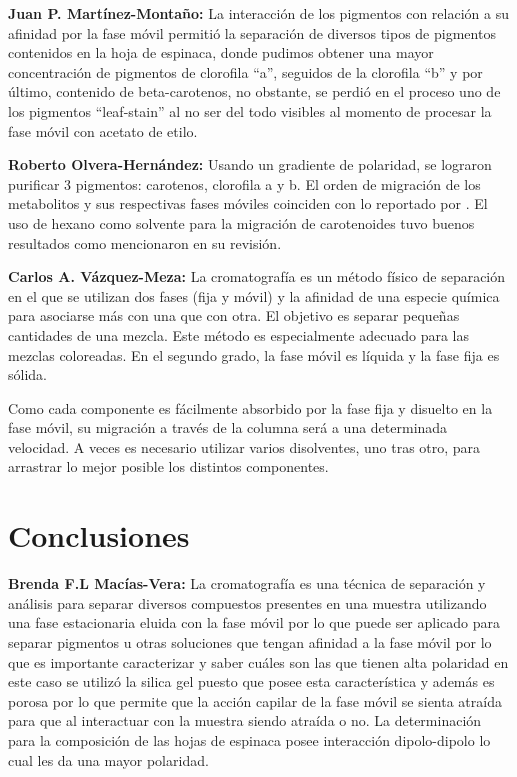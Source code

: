 \documentclass{ITESO-Report}
\begin{document}
{\color{darkgray}\bfseries Juan P. Martínez-Montaño:}\hspace{1em}
La interacción de los pigmentos con relación a su afinidad por la fase móvil permitió la separación de diversos tipos de pigmentos contenidos en la hoja de espinaca, donde pudimos obtener una mayor concentración de pigmentos de clorofila “a”, seguidos de la clorofila “b” y por último, contenido de beta-carotenos, no obstante, se perdió en el proceso uno de los pigmentos “leaf-stain” al no ser del todo visibles al momento de procesar la fase móvil con acetato de etilo.

{\color{darkgray}\bfseries Roberto Olvera-Hernández:}\hspace{1em}
Usando un gradiente de polaridad, se lograron purificar 3 pigmentos: carotenos, clorofila a y b. El orden de migración de los metabolitos y sus respectivas fases móviles coinciden con lo reportado por \textcite{Khalyfa1992}. El uso de hexano como solvente para la migración de carotenoides tuvo buenos resultados como mencionaron \textcite{Mussagy2018} en su revisión.

{\color{darkgray}\bfseries Carlos A. Vázquez-Meza:}\hspace{1em}
La cromatografía es un método físico de separación en el que se utilizan dos fases (fija y móvil) y la afinidad de una especie química para asociarse más con una que con otra. El objetivo es separar pequeñas cantidades de una mezcla. Este método es especialmente adecuado para las mezclas coloreadas. En el segundo grado, la fase móvil es líquida y la fase fija es sólida.

Como cada componente es fácilmente absorbido por la fase fija y disuelto en la fase móvil, su migración a través de la columna será a una determinada velocidad. A veces es necesario utilizar varios disolventes, uno tras otro, para arrastrar lo mejor posible los distintos componentes.


\section{Conclusiones}

{\color{darkgray}\bfseries Brenda F.L Macías-Vera:}\hspace{1em}
La cromatografía es una técnica de separación y análisis para separar diversos compuestos presentes en una muestra utilizando una fase estacionaria eluida con la fase móvil por lo que puede ser aplicado para separar pigmentos u otras soluciones que tengan afinidad a la fase móvil por lo que es importante caracterizar y saber cuáles son las que tienen alta polaridad en este caso se utilizó la silica gel puesto que posee esta característica y además es porosa por lo que permite que la acción capilar de la fase móvil se sienta atraída para que al interactuar con la muestra siendo atraída o no. La determinación para la composición de las hojas de espinaca posee interacción dipolo-dipolo lo cual les da una mayor polaridad.
\end{document}
